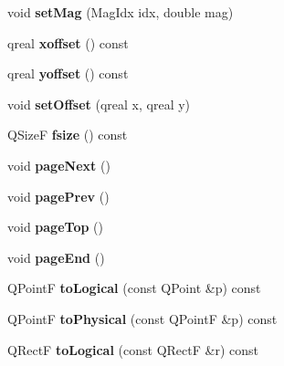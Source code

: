 \begin{DoxyCompactItemize}
void {\bfseries set\+Mag} (Mag\+Idx idx, double mag)
\item 
\mbox{\label{class_ms_1_1_score_view_affd680e8fef37423dcd00caa17d375e5}} 
qreal {\bfseries xoffset} () const
\item 
\mbox{\label{class_ms_1_1_score_view_a44c6bd40d3aa305ab04894c56f47d972}} 
qreal {\bfseries yoffset} () const
\item 
\mbox{\label{class_ms_1_1_score_view_a60ba9b7e2b84c28a8dbdfc3549f52544}} 
void {\bfseries set\+Offset} (qreal x, qreal y)
\item 
\mbox{\label{class_ms_1_1_score_view_ac5d599777a2d7b5e9750bfad3ddb8c14}} 
Q\+SizeF {\bfseries fsize} () const
\item 
\mbox{\label{class_ms_1_1_score_view_abad632b129432186a9b5c84b3ef096f3}} 
void {\bfseries page\+Next} ()
\item 
\mbox{\label{class_ms_1_1_score_view_afef24f41f99ba313d20ff8187e4d5232}} 
void {\bfseries page\+Prev} ()
\item 
\mbox{\label{class_ms_1_1_score_view_ab6a68eed7d8a3a5cb2fc2b2bdadcedda}} 
void {\bfseries page\+Top} ()
\item 
\mbox{\label{class_ms_1_1_score_view_a978708122185fbb15bb9a6cae3f18681}} 
void {\bfseries page\+End} ()
\item 
\mbox{\label{class_ms_1_1_score_view_a4c6f77da0fa4d340eeb104920e61f6f0}} 
Q\+PointF {\bfseries to\+Logical} (const Q\+Point \&p) const
\item 
\mbox{\label{class_ms_1_1_score_view_a9b9bcad9f407e2e23d09193971509a7e}} 
Q\+PointF {\bfseries to\+Physical} (const Q\+PointF \&p) const
\item 
\mbox{\label{class_ms_1_1_score_view_a38945486de97065abe7ae459f7a07f4f}} 
Q\+RectF {\bfseries to\+Logical} (const Q\+RectF \&r) const

\end{DoxyCompactItemize}
